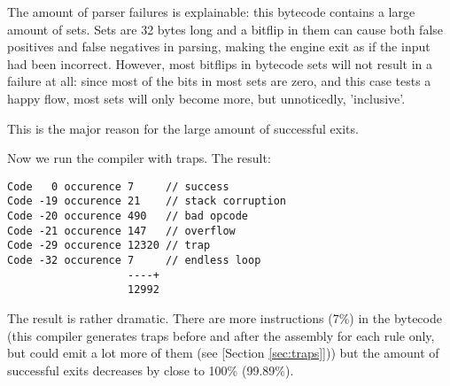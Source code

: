 The amount of parser failures is explainable: this bytecode contains
a large amount of sets. Sets are 32 bytes long and a bitflip in them
can cause both false positives and false negatives in parsing, making
the engine exit as if the input had been incorrect. However, most bitflips
in bytecode sets will not result in a failure at all: since most of the
bits in most sets are zero, and this case tests a happy flow, most sets
will only become more, but unnoticedly, 'inclusive'.

This is the major reason for the large amount of successful exits.

Now we run the compiler with traps. The result:

\begin{myquote}
\begin{verbatim}
Code   0 occurence 7     // success
Code -19 occurence 21    // stack corruption
Code -20 occurence 490   // bad opcode
Code -21 occurence 147   // overflow
Code -29 occurence 12320 // trap
Code -32 occurence 7     // endless loop
                   ----+
                   12992

\end{verbatim}
\end{myquote}

The result is rather dramatic. There are more instructions (7\%) in the bytecode
(this compiler generates traps before and after the assembly for each rule only,
but could emit a lot more of them (see [Section \ref{sec:traps}]))
but the amount of successful exits decreases by close to 100\% (99.89\%).
